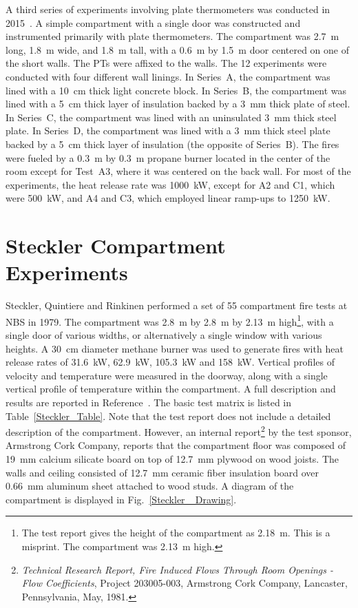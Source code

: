 A third series of experiments involving plate thermometers was conducted in 2015~\cite{Sjostrom:SP2016}. A simple compartment with a single door was constructed and instrumented primarily with plate thermometers. The compartment was 2.7~m long, 1.8~m wide, and 1.8~m tall, with a 0.6~m by 1.5~m door centered on one of the short walls. The PTs were affixed to the walls. The 12 experiments were conducted with four different wall linings. In Series~A, the compartment was lined with a 10~cm thick light concrete block. In Series~B, the compartment was lined with a 5~cm thick layer of insulation backed by a 3~mm thick plate of steel. In Series~C, the compartment was lined with an uninsulated 3~mm thick steel plate. In Series~D, the compartment was lined with a 3~mm thick steel plate backed by a 5~cm thick layer of insulation (the opposite of Series~B). The fires were fueled by a 0.3~m by 0.3~m propane burner located in the center of the room except for Test~A3, where it was centered on the back wall. For most of the experiments, the heat release rate was 1000~kW, except for A2 and C1, which were 500~kW, and A4 and C3, which employed linear ramp-ups to 1250~kW.


\section{Steckler Compartment Experiments}

Steckler, Quintiere and Rinkinen performed a set of 55 compartment fire tests at NBS in 1979. The compartment was 2.8~m by 2.8~m by 2.13~m high\footnote{The test report gives the height of the compartment as 2.18~m. This is a misprint. The compartment was 2.13~m high.}, with a single door of various widths, or alternatively a single window with various heights. A 30~cm diameter methane burner was used to generate fires with heat release rates of 31.6~kW, 62.9~kW, 105.3~kW and 158~kW. Vertical profiles of velocity and temperature were measured in the doorway, along with a single vertical profile of temperature within the compartment. A full description and results are reported in Reference~\cite{Steckler:NBSIR_82-2520}. The basic test matrix is listed in Table~\ref{Steckler_Table}. Note that the test report does not include a detailed description of the compartment. However, an internal report\footnote{ {\em Technical Research Report, Fire Induced Flows Through Room Openings - Flow Coefficients}, Project 203005-003, Armstrong Cork Company, Lancaster, Pennsylvania, May, 1981.} by the test sponsor, Armstrong Cork Company, reports that the compartment floor was composed of 19~mm calcium silicate board on top of 12.7~mm plywood on wood joists. The walls and ceiling consisted of 12.7~mm ceramic fiber insulation board over 0.66~mm aluminum sheet attached to wood studs. A diagram of the compartment is displayed in Fig.~\ref{Steckler_ Drawing}.

